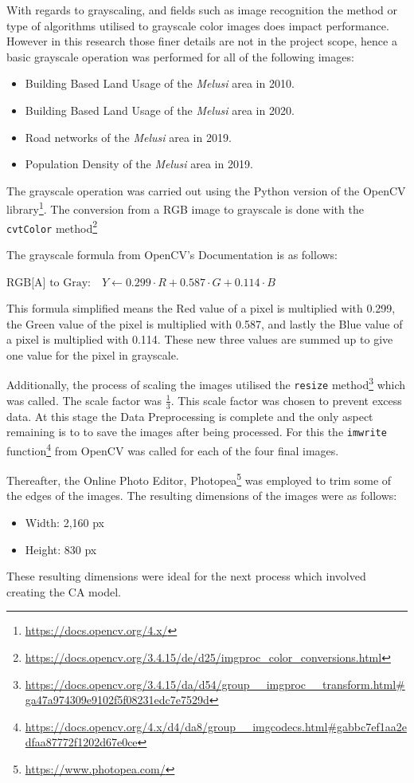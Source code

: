 With regards to grayscaling, and fields such as image recognition the method or type of algorithms utilised to grayscale color images does impact performance.\cite{gray} However in this research those finer details are not in the project scope, hence a basic grayscale operation was performed for all of the following images:
\begin{itemize}
\item Building Based Land Usage of the \textit{Melusi} area in 2010.
\item Building Based Land Usage of the \textit{Melusi} area in 2020.
\item Road networks of the \textit{Melusi} area in 2019.
\item Population Density of the \textit{Melusi} area in 2019.
\end{itemize}

The grayscale operation was carried out using the Python version of the OpenCV library\footnote{\url{https://docs.opencv.org/4.x/}}. The conversion from a RGB image to grayscale is done with the \texttt{cvtColor} method\footnote{\url{https://docs.opencv.org/3.4.15/de/d25/imgproc_color_conversions.html}}

The grayscale formula from OpenCV's Documentation is as follows:
\begin{center}
$\text{RGB[A] to Gray:} \quad Y \leftarrow 0.299 \cdot R + 0.587 \cdot G + 0.114 \cdot B$
\end{center}
This formula simplified means the Red value of a pixel is multiplied with 0.299, the Green value of the pixel is multiplied with 0.587, and lastly the Blue value of a pixel is multiplied with 0.114. These new three values are summed up to give one value for the pixel in grayscale.

Additionally, the process of scaling the images utilised the \texttt{resize} method\footnote{\url{https://docs.opencv.org/3.4.15/da/d54/group\_\_imgproc\_\_transform.html\#ga47a974309e9102f5f08231edc7e7529d}} which was called. The scale factor was $\frac{1}{3}$. This scale factor was chosen to prevent excess data. At this stage the Data Preprocessing is complete and the only aspect remaining is to to save the images after being processed. For this the \texttt{imwrite} function\footnote{\url{https://docs.opencv.org/4.x/d4/da8/group__imgcodecs.html\#gabbc7ef1aa2edfaa87772f1202d67e0ce}} from OpenCV was called for each of the four final images.

Thereafter, the Online Photo Editor, Photopea\footnote{\url{https://www.photopea.com/}} was employed to trim some of the edges of the images. The resulting dimensions of the images were as follows:
\begin{itemize}
\item Width: 2,160 px
\item Height: 830 px
\end{itemize}
These resulting dimensions were ideal for the next process which involved creating the CA model.
